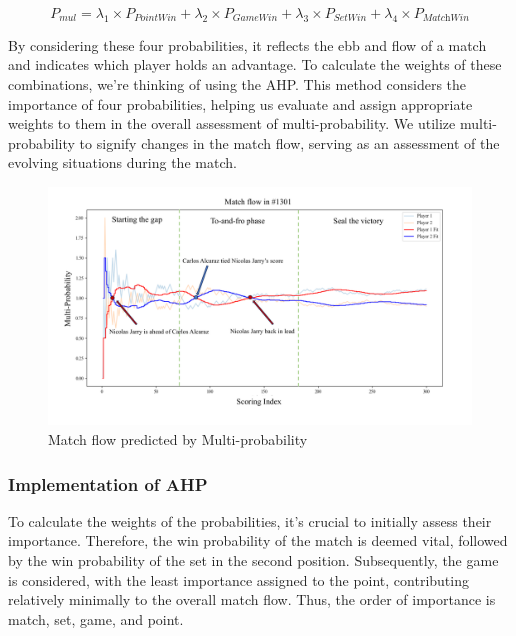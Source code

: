 \documentclass{mcmthesis}
\begin{document}
\begin{equation}
\label{Eq: mul}
    P_\textit{mul} = \lambda_1 \times P_\textit{PointWin} + \lambda_2 \times P_\textit{GameWin} + \lambda_3 \times P_\textit{SetWin} + \lambda_4 \times P_\textit{MatchWin}
\end{equation}

By considering these four probabilities, it reflects the ebb and flow of a match and indicates which player holds an advantage. To calculate the weights of these combinations, we're thinking of using the AHP. This method considers the importance of four probabilities, helping us evaluate and assign appropriate weights to them in the overall assessment of multi-probability. We utilize multi-probability to signify changes in the match flow, serving as an assessment of the evolving situations during the match.
\begin{figure}[ht]
    \centering
    \begin{minipage}{0.8\textwidth}
        \centering
        \includegraphics[width=\textwidth]{figures/match_flow.pdf} %
        \caption{Match flow predicted by Multi-probability}
        \label{fig:match_flow}
    \end{minipage}\hfill
\end{figure}

\subsubsection{Implementation of AHP}
\label{ahp}
To calculate the weights of the probabilities, it's crucial to initially assess their importance. Therefore, the win probability of the match is deemed vital, followed by the win probability of the set in the second position. Subsequently, the game is considered, with the least importance assigned to the point, contributing relatively minimally to the overall match flow. Thus, the order of importance is match, set, game, and point. 
\end{document}
